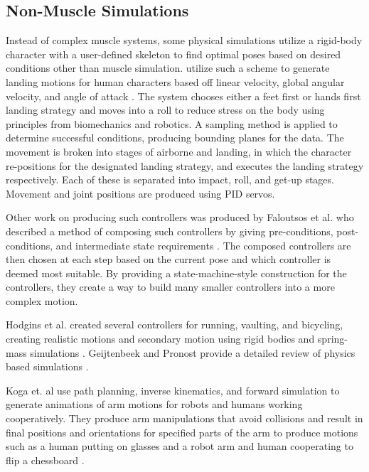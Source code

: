 \subsection{Non-Muscle Simulations}
\label{subsection:rigid_body_bg}
Instead of complex muscle systems, some physical simulations utilize a rigid-body character with a user-defined skeleton to find optimal poses based on desired conditions other than muscle simulation.  \liufall{} utilize such a scheme to generate landing motions for human characters based off linear velocity, global angular velocity, and angle of attack  \cite{falling_landing}.  The system chooses either a feet first or hands first landing strategy and moves into a roll to reduce stress on the body using principles from biomechanics and robotics.  A sampling method is applied to determine successful conditions, producing bounding planes for the data.  The movement is broken into stages of airborne and landing, in which the character re-positions for the designated landing strategy, and executes the landing strategy respectively. Each of these is separated into impact, roll, and get-up stages.  Movement and joint positions are produced using PID servos.  

Other work on producing such controllers was produced by Faloutsos et al. who described a method of composing such controllers by giving pre-conditions, post-conditions, and intermediate state requirements \cite{composable_controllers}.  The composed controllers are then chosen at each step based on the current pose and which controller is deemed most suitable.  By providing a state-machine-style construction for the controllers, they create a way to build many smaller controllers into a more complex motion.

Hodgins et al. created several controllers for running, vaulting, and bicycling, creating realistic motions and secondary motion using rigid bodies and spring-mass simulations \cite{anim_human_athletics}.  Geijtenbeek and Pronost provide a detailed review of physics based simulations \cite{inter_physics_anim}.

Koga et. al use path planning, inverse kinematics, and forward simulation to generate animations of arm motions for robots and humans working cooperatively.  They produce arm manipulations that avoid collisions and result in final positions and orientations for specified parts of the arm to produce motions such as a human putting on glasses and a robot arm and human cooperating to flip a chessboard \cite{motion_intentions}.

